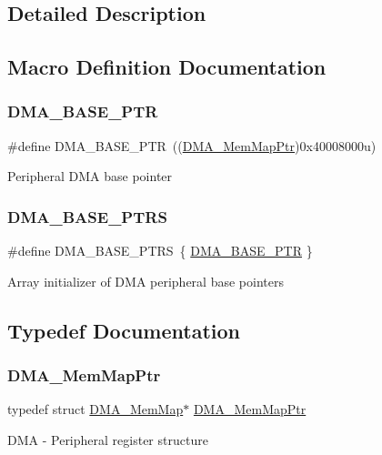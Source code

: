\subsection{Detailed Description}


\subsection{Macro Definition Documentation}
\mbox{\label{group___d_m_a___peripheral_ga6997fbc1b1973e9f27170217a3bd6f22}} 
\subsubsection{\texorpdfstring{D\+M\+A\+\_\+\+B\+A\+S\+E\+\_\+\+P\+TR}{DMA\_BASE\_PTR}}
{\footnotesize\ttfamily \#define D\+M\+A\+\_\+\+B\+A\+S\+E\+\_\+\+P\+TR~((\hyperlink{group___d_m_a___peripheral_ga160c27c95a39a9791079b32fe7e843a1}{D\+M\+A\+\_\+\+Mem\+Map\+Ptr})0x40008000u)}

Peripheral D\+MA base pointer \mbox{\label{group___d_m_a___peripheral_gada914e90165e25ae4eeddf5175920e77}} 
\subsubsection{\texorpdfstring{D\+M\+A\+\_\+\+B\+A\+S\+E\+\_\+\+P\+T\+RS}{DMA\_BASE\_PTRS}}
{\footnotesize\ttfamily \#define D\+M\+A\+\_\+\+B\+A\+S\+E\+\_\+\+P\+T\+RS~\{ \hyperlink{group___d_m_a___peripheral_ga6997fbc1b1973e9f27170217a3bd6f22}{D\+M\+A\+\_\+\+B\+A\+S\+E\+\_\+\+P\+TR} \}}

Array initializer of D\+MA peripheral base pointers 

\subsection{Typedef Documentation}
\mbox{\label{group___d_m_a___peripheral_ga160c27c95a39a9791079b32fe7e843a1}} 
\subsubsection{\texorpdfstring{D\+M\+A\+\_\+\+Mem\+Map\+Ptr}{DMA\_MemMapPtr}}
{\footnotesize\ttfamily typedef struct \hyperlink{struct_d_m_a___mem_map}{D\+M\+A\+\_\+\+Mem\+Map}$\ast$ \hyperlink{group___d_m_a___peripheral_ga160c27c95a39a9791079b32fe7e843a1}{D\+M\+A\+\_\+\+Mem\+Map\+Ptr}}

D\+MA -\/ Peripheral register structure 
